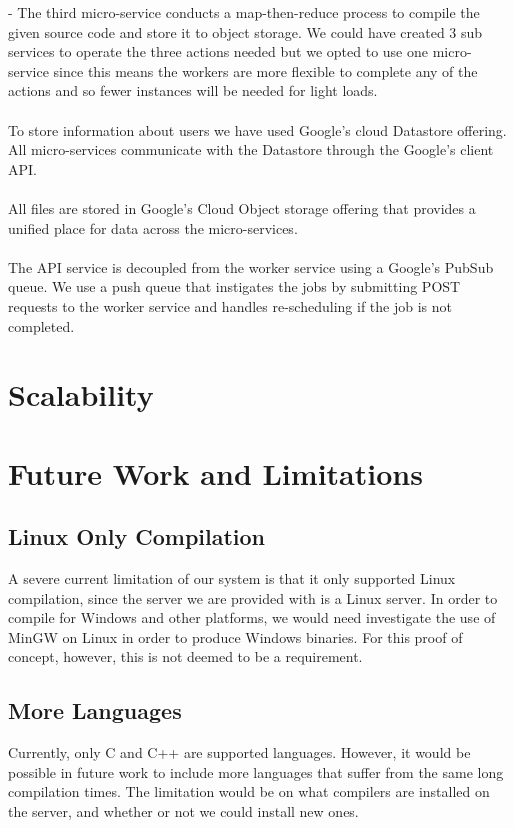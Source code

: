 \documentclass[conference]{IEEEtran}
\begin{document}
- The third micro-service conducts a map-then-reduce process to compile the given source code and store it to object storage. We could have created 3 sub services to operate the three actions needed but we opted to use one micro-service since this means the workers are more flexible to complete any of the actions and so fewer instances will be needed for light loads.
\\\\
To store information about users we have used Google's cloud Datastore offering. All micro-services communicate with the Datastore through the Google's client API.
\\\\
All files are stored in Google's Cloud Object storage offering that provides a unified place for data across the micro-services.
\\\\
The API service is decoupled from the worker service using a Google's PubSub queue. We use a push queue that instigates the jobs by submitting POST requests to the worker service and handles re-scheduling if the  job is not completed.

\section{Scalability}
\section{Future Work and Limitations}
\subsection{Linux Only Compilation}
A severe current limitation of our system is that it only supported Linux
compilation, since the server we are provided with is a Linux server. In order
to compile for Windows and other platforms, we would need investigate the use of
MinGW on Linux in order to produce Windows binaries. For this proof of concept,
however, this is not deemed to be a requirement.
\subsection{More Languages}
Currently, only C and C++ are supported languages. However, it would be possible
in future work to include more languages that suffer from the same long
compilation times. The limitation would be on what compilers are installed on
the server, and whether or not we could install new ones.
\end{document}
